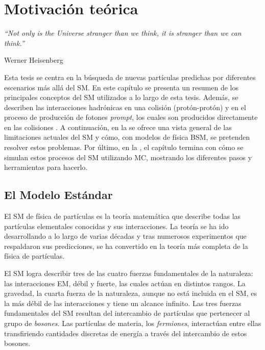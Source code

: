 \chapter{Motivación teórica}
\label{ch:theory}
\epigraph{\emph{\enquote{Not only is the Universe stranger than we think, it is stranger than we can think.}}}{Werner Heisenberg}


Esta tesis se centra en la búsqueda de nuevas partículas predichas por diferentes escenarios más allá del \ac{SM}. En este capítulo se presenta un resumen de los principales conceptos del \ac{SM} utilizados a lo largo de esta tesis. Además, se describen las interacciones hadrónicas en una colisión \pp (protón-protón) y en el proceso de producción de fotones \textit{prompt}, los cuales son producidos directamente en las colisiones \pp.
A continuación, en la \Sect{\ref{sec:theory:bsm}} se ofrece una vista general de las limitaciones actuales del \ac{SM} y cómo, con modelos de física \ac{BSM}, se pretenden resolver estos problemas.
Por último, en la \Sect{\ref{sec:theory:mc_simulation}}, el capítulo termina con cómo se simulan estos procesos del \ac{SM} utilizando \ac{MC}, mostrando los diferentes pasos y herramientas para hacerlo.




\section{El Modelo Estándar}
\label{sec:theory:sm}

El \acf{SM} de física de partículas es la teoría matemática que describe todas las partículas elementales conocidas y sus interacciones.
La teoría se ha ido desarrollando a lo largo de varias décadas y tras numerosos experimentos que respaldaron sus predicciones, se ha convertido en la teoría más completa de la física de partículas.

El \ac{SM} logra describir tres de las cuatro fuerzas fundamentales de la naturaleza: las interacciones \ac{EM}, débil y fuerte, las cuales actúan en distintos rangos.
La gravedad, la cuarta fuerza de la naturaleza, aunque no está incluida en el \ac{SM}, es la más débil de las interacciones y tiene un alcance infinito.
Las tres fuerzas fundamentales del \ac{SM} resultan del intercambio de partículas que pertenecer al grupo de \textit{bosones}. Las partículas de materia, los \textit{fermiones}, interactúan entre ellas transfiriendo cantidades discretas de energía a través del intercambio de estos bosones.




